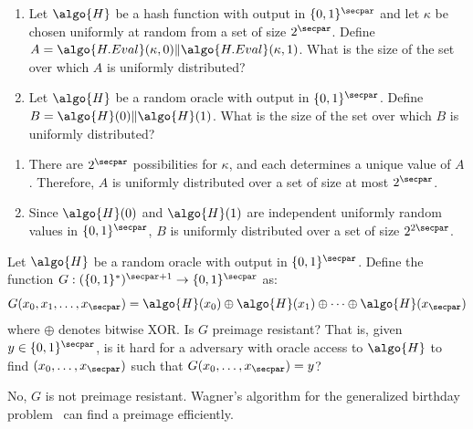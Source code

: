 \begin{exercise}[Optional]
  \begin{enumerate}
    \item Let $\algo{H}$ be a hash function with output in $\{0,1\}^\secpar$ and let $\kappa$ be chosen uniformly at random from a set of size $2^\secpar$. Define $A = \algo{H.Eval}(\kappa, 0) \| \algo{H.Eval}(\kappa, 1)$. What is the size of the set over which $A$ is uniformly distributed?
    \item Let $\algo{H}$ be a random oracle with output in $\{0,1\}^\secpar$. Define $B = \algo{H}(0) \| \algo{H}(1)$. What is the size of the set over which $B$ is uniformly distributed?
  \end{enumerate}
\end{exercise}

\ifsolutions
\begin{mysolution}
  \begin{enumerate}
    \item There are $2^\secpar$ possibilities for $\kappa$, and each determines a unique value of $A$. Therefore, $A$ is uniformly distributed over a set of size at most $2^\secpar$.
    \item Since $\algo{H}(0)$ and $\algo{H}(1)$ are independent uniformly random values in $\{0,1\}^\secpar$, $B$ is uniformly distributed over a set of size $2^{2\secpar}$.
  \end{enumerate}
\end{mysolution}
\fi

\begin{exercise}[Optional]
  Let $\algo{H}$ be a random oracle with output in $\{0,1\}^\secpar$. Define the function $G: (\{0,1\}^*)^{\secpar+1} \rightarrow \{0,1\}^\secpar$ as:
  \[
  G(x_0, x_1, \ldots, x_\secpar) = \algo{H}(x_0) \oplus \algo{H}(x_1) \oplus \cdots \oplus \algo{H}(x_\secpar)
  \]
  where $\oplus$ denotes bitwise XOR. Is $G$ preimage resistant? That is, given $y \in \{0,1\}^\secpar$, is it hard for a \ppt adversary with oracle access to $\algo{H}$ to find $(x_0, \ldots, x_\secpar)$ such that $G(x_0, \ldots, x_\secpar) = y$?
\end{exercise}

\ifsolutions
\begin{mysolution}
  No, $G$ is not preimage resistant. Wagner's algorithm for the generalized birthday problem~\cite{C:Wagner02} can find a preimage efficiently.
\end{mysolution}
\fi

